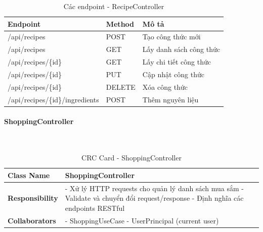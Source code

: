 \begin{table}[H]
\small
\renewcommand{\arraystretch}{1.3}
\begin{tabularx}{\textwidth}{|>{\raggedright\arraybackslash}p{4.5cm}|>{\raggedright\arraybackslash}p{2cm}|X|}
\hline
\rowcolor{gray!20}
\textbf{Endpoint} & \textbf{Method} & \textbf{Mô tả} \\
\hline
/api/recipes & POST & Tạo công thức mới \\
\hline
/api/recipes & GET & Lấy danh sách công thức \\
\hline
/api/recipes/\{id\} & GET & Lấy chi tiết công thức \\
\hline
/api/recipes/\{id\} & PUT & Cập nhật công thức \\
\hline
/api/recipes/\{id\} & DELETE & Xóa công thức \\
\hline
/api/recipes/\{id\}/ingredients & POST & Thêm nguyên liệu \\
\hline
\end{tabularx}
\caption{Các endpoint - RecipeController}
\end{table}

\paragraph{ShoppingController} ~\\

\begin{table}[H]
\small
\renewcommand{\arraystretch}{1.3}
\begin{tabularx}{\textwidth}{|>{\raggedright\arraybackslash}p{3.5cm}|X|}
\hline
\rowcolor{gray!20}
\textbf{Class Name} & ShoppingController \\
\hline
\textbf{Responsibility} & - Xử lý HTTP requests cho quản lý danh sách mua sắm \newline - Validate và chuyển đổi request/response \newline - Định nghĩa các endpoints RESTful \\
\hline
\textbf{Collaborators} & - ShoppingUseCase \newline - UserPrincipal (current user) \\
\hline
\end{tabularx}
\caption{CRC Card - ShoppingController}
\end{table}

